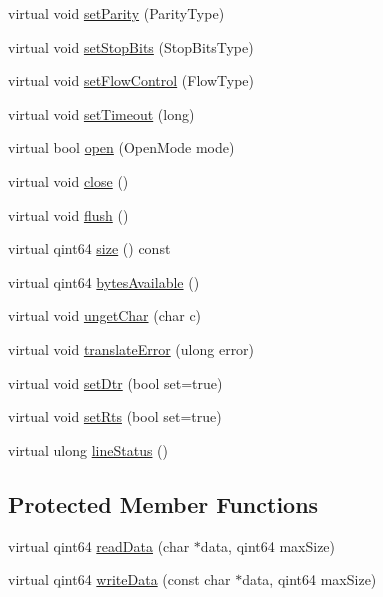 \begin{DoxyCompactItemize}
\item 
virtual void \mbox{\hyperlink{class_posix___qext_serial_port_a22dedc4f44c33b13f64bff33f844f795}{set\+Parity}} (Parity\+Type)
\item 
virtual void \mbox{\hyperlink{class_posix___qext_serial_port_a34b54ac1bef6090010bf00a45dc173fe}{set\+Stop\+Bits}} (Stop\+Bits\+Type)
\item 
virtual void \mbox{\hyperlink{class_posix___qext_serial_port_a8bdd56422fbb95da7216f182a1ef6cfb}{set\+Flow\+Control}} (Flow\+Type)
\item 
virtual void \mbox{\hyperlink{class_posix___qext_serial_port_a33cde9629cc224628258dedbb5b48392}{set\+Timeout}} (long)
\item 
virtual bool \mbox{\hyperlink{class_posix___qext_serial_port_a200cb519edfef82199bf1701f4b872e9}{open}} (Open\+Mode mode)
\item 
virtual void \mbox{\hyperlink{class_posix___qext_serial_port_a3a7ddf86a867770c88777c3e78545cb0}{close}} ()
\item 
virtual void \mbox{\hyperlink{class_posix___qext_serial_port_a5f12a1a6c1c6a163fe146272e9a7d275}{flush}} ()
\item 
virtual qint64 \mbox{\hyperlink{class_posix___qext_serial_port_a6687bed8a582b144763eb11c4240dbe5}{size}} () const
\item 
virtual qint64 \mbox{\hyperlink{class_posix___qext_serial_port_a6d593fe4f4623e93537a531d2c6157b7}{bytes\+Available}} ()
\item 
virtual void \mbox{\hyperlink{class_posix___qext_serial_port_a3a425e78db628945a666c52aa8638d0f}{unget\+Char}} (char c)
\item 
virtual void \mbox{\hyperlink{class_posix___qext_serial_port_aa099923f1360a08c6b7072254fd056e6}{translate\+Error}} (ulong error)
\item 
virtual void \mbox{\hyperlink{class_posix___qext_serial_port_a089c560fd901eabe7190e80a36c7dcb8}{set\+Dtr}} (bool set=true)
\item 
virtual void \mbox{\hyperlink{class_posix___qext_serial_port_aa099a4b3f406cf017e1dfe55da3a2c6a}{set\+Rts}} (bool set=true)
\item 
virtual ulong \mbox{\hyperlink{class_posix___qext_serial_port_ab419544e866cab58b8a3ce6341f6a7e9}{line\+Status}} ()
\end{DoxyCompactItemize}
\subsection*{Protected Member Functions}
\begin{DoxyCompactItemize}
\item 
virtual qint64 \mbox{\hyperlink{class_posix___qext_serial_port_a73b99fe7198e7e94b13c13416a6b9fae}{read\+Data}} (char $\ast$data, qint64 max\+Size)
\item 
virtual qint64 \mbox{\hyperlink{class_posix___qext_serial_port_ae8aabe89e479259b0b991dbd6b424f78}{write\+Data}} (const char $\ast$data, qint64 max\+Size)
\end{DoxyCompactItemize}
